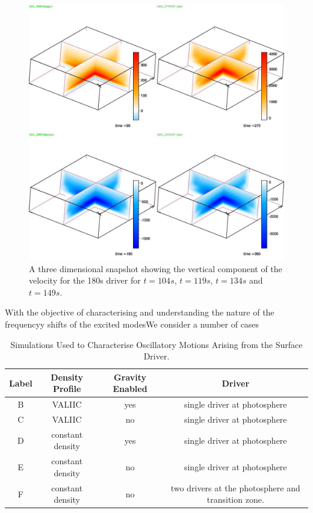 \documentclass{aa}
\begin{document}

\begin{figure}[h]
\includegraphics[scale=0.5]{images/6b0_3d.jpg}
\caption{A three dimensional snapshot showing the vertical component of the velocity for the 180s driver for $t=104s$, $t=119s$, $t=134s$ and $t=149s$. }
\end{figure}
















With the objective of characterising and understanding the nature of the frequencyy shifts of the excited modesWe consider a number of cases

\begin{table}
\centering
\begin{tabular}{c c c c }
\hline
Label   &  Density Profile & Gravity Enabled & Driver\\
\hline
B &  VALIIC & yes & single driver at photosphere & \\
\hline
C & VALIIC & no & single driver at photosphere &  \\
\hline
D & constant density & yes & single driver at photosphere &  \\
\hline
E & constant density & no & single driver at photosphere &  \\
\hline
F & constant density & no & two drivers at the photosphere and transition zone. &  \\
\hline
\end{tabular} 
\caption{Simulations Used to Characterise Oscillatory Motions Arising from the Surface Driver.}
\end{table}
\end{document}
